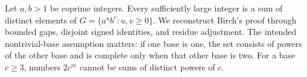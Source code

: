 Let $a,b>1$ be coprime integers. Every sufficiently large integer
is a sum of distinct elements of
$G=\{a^u b^v:u,v\geq0\}$. We reconstruct Birch's proof through
bounded gaps, disjoint signed identities, and residue adjustment.
The intended nontrivial-base assumption matters: if one base is
one, the set consists of powers of the other base and is complete
only when that other base is two. For a base $c\geq3$, numbers
$2c^m$ cannot be sums of distinct powers of $c$.
